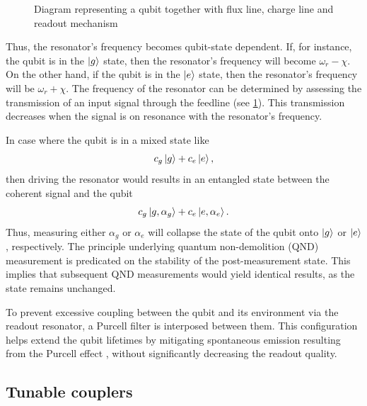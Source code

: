 \begin{figure}
    \centering
    
    \vspace{-1cm}
    \caption{Diagram representing a qubit together with flux line, charge line and readout mechanism}
    \label{fig:diagram_storage_qubit}
\end{figure}

Thus, the resonator's frequency becomes qubit-state dependent.
If, for instance, the qubit is in the $\ket{g}$ state, then the resonator's frequency will become $\omega_r - \chi$.
On the other hand, if the qubit is in the $\ket{e}$ state, then the resonator's frequency will be $\omega_r + \chi$.
The frequency of the resonator can be determined by assessing the transmission of an input signal through the feedline (see \cref{fig:diagram_storage_qubit}).
This transmission decreases when the signal is on resonance with the resonator's frequency.

In case where the qubit is in a mixed state like
\begin{equation}
    c_g \ket{g} + c_e \ket{e} ,
\end{equation}
then driving the resonator would results in an entangled state between the coherent signal and the qubit
\begin{equation}
    c_g \ket{g, \alpha_g} + c_e \ket{e, \alpha_e} .
\end{equation}
Thus, measuring either $\alpha_g$ or $\alpha_e$ will collapse the state of the qubit onto $\ket{g}$ or $\ket{e}$, respectively.
The principle underlying quantum non-demolition (QND) measurement is predicated on the stability of the post-measurement state.
This implies that subsequent QND measurements would yield identical results, as the state remains unchanged.

To prevent excessive coupling between the qubit and its environment via the readout resonator, a Purcell filter is interposed between them.
This configuration helps extend the qubit lifetimes by mitigating spontaneous emission resulting from the Purcell effect \cite{Purcell_effect}, without significantly decreasing the readout quality.

\subsection{Tunable couplers}

